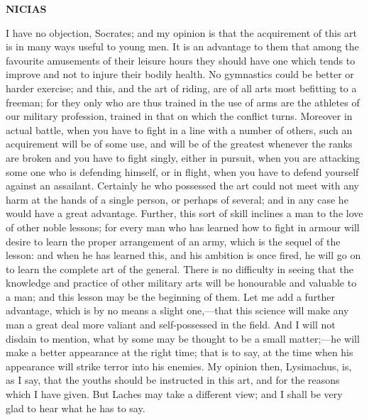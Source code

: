 \documentclass[11pt,letter]{book}
\begin{document}
\par \textbf{NICIAS}
\par   I have no objection, Socrates; and my opinion is that the acquirement of this art is in many ways useful to young men. It is an advantage to them that among the favourite amusements of their leisure hours they should have one which tends to improve and not to injure their bodily health. No gymnastics could be better or harder exercise; and this, and the art of riding, are of all arts most befitting to a freeman; for they only who are thus trained in the use of arms are the athletes of our military profession, trained in that on which the conflict turns. Moreover in actual battle, when you have to fight in a line with a number of others, such an acquirement will be of some use, and will be of the greatest whenever the ranks are broken and you have to fight singly, either in pursuit, when you are attacking some one who is defending himself, or in flight, when you have to defend yourself against an assailant. Certainly he who possessed the art could not meet with any harm at the hands of a single person, or perhaps of several; and in any case he would have a great advantage. Further, this sort of skill inclines a man to the love of other noble lessons; for every man who has learned how to fight in armour will desire to learn the proper arrangement of an army, which is the sequel of the lesson:  and when he has learned this, and his ambition is once fired, he will go on to learn the complete art of the general. There is no difficulty in seeing that the knowledge and practice of other military arts will be honourable and valuable to a man; and this lesson may be the beginning of them. Let me add a further advantage, which is by no means a slight one,—that this science will make any man a great deal more valiant and self-possessed in the field. And I will not disdain to mention, what by some may be thought to be a small matter;—he will make a better appearance at the right time; that is to say, at the time when his appearance will strike terror into his enemies. My opinion then, Lysimachus, is, as I say, that the youths should be instructed in this art, and for the reasons which I have given. But Laches may take a different view; and I shall be very glad to hear what he has to say.
\end{document}
